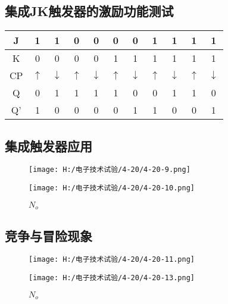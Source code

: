 \documentclass{article}
\begin{document}
\newpage
  \subsection{集成JK触发器的激励功能测试}
\begin{table}[h]
  \centering  
  \begin{tabular}{c|c|c|c|c|c|c|c|c|c|c}
      \hline
            J  &1         &1          &0        &0          &0        &0         &1         &1          &1        &1   \\ \hline
            K  &0         &0          &0        &0          &1        &1         &1         &1          &1        &1    \\ \hline
            CP &$\uparrow$  &$\downarrow$ &$\uparrow $&$\downarrow$ &$\uparrow$ &$\downarrow$ &$\uparrow$ &$\downarrow $&$\uparrow $&$\downarrow$     \\ \hline
            Q  &0         &1          &1        &1          &1        &0         &0         &1          &1        &0   \\ \hline
            Q' &1         &0          &0        &0          &0        &1         &1         &0          &0        &1    \\ \hline
          \end{tabular}
 \end{table}

 \subsection{集成触发器应用}
 \begin{figure}[h]
  \begin{minipage}[t]{0.5\linewidth} %
    \centering   
    \texttt{[image: H:/电子技术试验/4-20/4-20-9.png]}   
    \caption{$I_{EH}$}   
    \label{fig:side:a}   
  \end{minipage}%
  \begin{minipage}[t]{0.5\linewidth}   
    \centering   
    \texttt{[image: H:/电子技术试验/4-20/4-20-10.png]}   
    \caption{$N_o$}   
    \label{fig:side:b}   
  \end{minipage}   
\end{figure}
\newpage
\subsection{竞争与冒险现象}
\begin{figure}[h]
  \begin{minipage}[t]{0.5\linewidth} %
    \centering   
    \texttt{[image: H:/电子技术试验/4-20/4-20-11.png]}   
    \caption{$I_{EH}$}   
    \label{fig:side:a}   
  \end{minipage}%
  \begin{minipage}[t]{0.5\linewidth}   
    \centering   
    \texttt{[image: H:/电子技术试验/4-20/4-20-13.png]}   
    \caption{$N_o$}   
    \label{fig:side:b}   
  \end{minipage}   
\end{figure}
\end{document}
